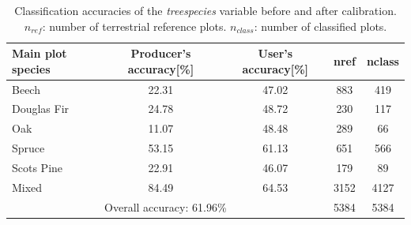 \begin{table}[H]
	\begin{center}
		\caption{Classification accuracies of the \textit{treespecies} variable before and after calibration. $n_{ref}$: number of terrestrial reference plots. $n_{class}$: number of classified plots.}
		\vspace{0.2cm}
		\label{tab:classacc}
		{\small %
			\begin{tabular}{l|c|c|c|c} %
				\hline
				Main plot species & Producer's accuracy[\%] & User's accuracy[\%] & nref & nclass \\
				\hline \hline	
				Beech       & 22.31 & 47.02 & 883 & 419 \\
				Douglas Fir & 24.78 & 48.72 & 230 & 117 \\
				Oak         & 11.07 & 48.48 & 289 & 66 \\
				Spruce      & 53.15 & 61.13 & 651 & 566 \\
				Scots Pine  & 22.91 & 46.07 & 179 & 89 \\
				Mixed       & 84.49 & 64.53 & 3152 & 4127 \\
				\hlineB{2}
				& \multicolumn{2}{l|}{Overall accuracy: 61.96\%} & 5384 & 5384 \\
				\hline \hline
			\end{tabular}
		}%
	\end{center}
\end{table}

